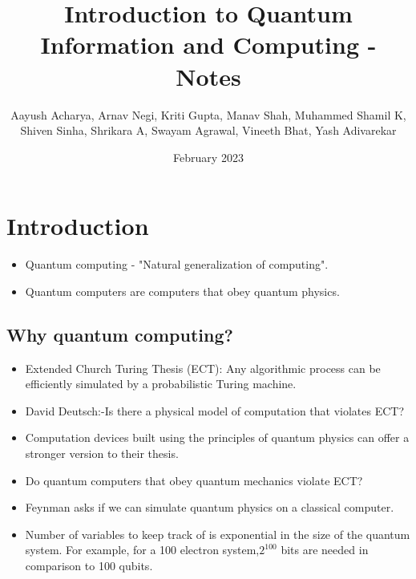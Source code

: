 \documentclass{article}
\title{Introduction to Quantum Information and Computing - Notes}
\author{Aayush Acharya, Arnav Negi, Kriti Gupta, Manav Shah, Muhammed Shamil K,\\ Shiven Sinha, Shrikara A, Swayam Agrawal, Vineeth Bhat, Yash Adivarekar} %
\date{February 2023}
\begin{document}
\maketitle
\vfill
\tableofcontents
\newpage
{}



\section{Introduction}
\begin{itemize}
	\item Quantum computing - "Natural generalization of computing".
\end{itemize}
\begin{itemize}
	\item Quantum computers are computers that obey quantum physics.
\end{itemize}


\subsection{Why quantum computing?}
\begin{itemize}
	\item Extended Church Turing Thesis (ECT): Any algorithmic process can be efficiently simulated by a probabilistic Turing machine.
\end{itemize}
\begin{itemize}
	\item David Deutsch:-Is there a physical model of computation that violates ECT?
\end{itemize}
\begin{itemize}
	\item Computation devices built using the principles of quantum physics can offer a stronger version to their thesis.
\end{itemize}\begin{itemize}
	\item Do quantum computers that obey quantum mechanics violate ECT?
\end{itemize}\begin{itemize}
	\item Feynman asks if we can simulate quantum physics on a classical computer.
\end{itemize}\begin{itemize}
	\item Number of variables to keep track of is exponential in the size of the quantum system. For example, for a 100 electron system,${2^{100}}$ bits are needed in comparison to 100 qubits.
\end{itemize}
\end{document}
